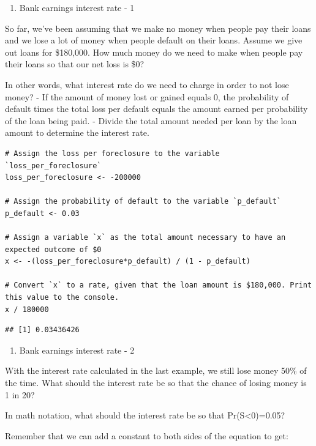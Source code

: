 \documentclass[
]{article}
\providecommand{\tightlist}{%
  \setlength{\itemsep}{0pt}\setlength{\parskip}{0pt}}
\begin{document}
\begin{enumerate}
\def\labelenumi{\arabic{enumi}.}
\setcounter{enumi}{4}
\tightlist
\item
  Bank earnings interest rate - 1
\end{enumerate}

So far, we've been assuming that we make no money when people pay their
loans and we lose a lot of money when people default on their loans.
Assume we give out loans for \$180,000. How much money do we need to
make when people pay their loans so that our net loss is \$0?

In other words, what interest rate do we need to charge in order to not
lose money? - If the amount of money lost or gained equals 0, the
probability of default times the total loss per default equals the
amount earned per probability of the loan being paid. - Divide the total
amount needed per loan by the loan amount to determine the interest
rate.

\begin{verbatim}
# Assign the loss per foreclosure to the variable `loss_per_foreclosure`
loss_per_foreclosure <- -200000

# Assign the probability of default to the variable `p_default`
p_default <- 0.03

# Assign a variable `x` as the total amount necessary to have an expected outcome of $0
x <- -(loss_per_foreclosure*p_default) / (1 - p_default)

# Convert `x` to a rate, given that the loan amount is $180,000. Print this value to the console.
x / 180000
\end{verbatim}

\begin{verbatim}
## [1] 0.03436426
\end{verbatim}

\begin{enumerate}
\def\labelenumi{\arabic{enumi}.}
\setcounter{enumi}{5}
\tightlist
\item
  Bank earnings interest rate - 2
\end{enumerate}

With the interest rate calculated in the last example, we still lose
money 50\% of the time. What should the interest rate be so that the
chance of losing money is 1 in 20?

In math notation, what should the interest rate be so that
Pr(S\textless0)=0.05?

Remember that we can add a constant to both sides of the equation to
get:
\end{document}
